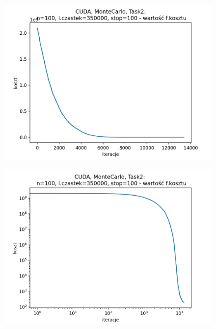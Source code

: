 \documentclass[11pt, a4paper, oneside]{article}
\begin{document}
\begin{figure}[H]
\centering
\begin{minipage}[b]{\dimexpr.5\textwidth-1em}
  \centering
  \includegraphics[width=1\linewidth]{grafiki/CUDA/CUDA_MonteCarlo_Task2_koszt_linear.png}
  \label{fig:koszt:MC2CUDA}
\end{minipage} \hfill
\begin{minipage}[b]{\dimexpr.5\textwidth-1em}
  \centering
  \includegraphics[width=1\linewidth]{grafiki/CUDA/CUDA_MonteCarlo_Task2_koszt_log.png}
  \label{fig:koszt:MC2CUDAlog}
\end{minipage}
\end{figure}
\end{document}
